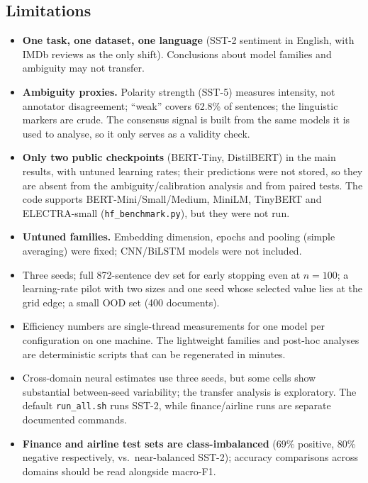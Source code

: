 \documentclass[11pt,a4paper]{article}
\begin{document}
\subsection*{Limitations}
\begin{itemize}
\item \textbf{One task, one dataset, one language} (SST-2 sentiment in English, with IMDb reviews as the only shift). Conclusions about model families and ambiguity may not transfer.
\item \textbf{Ambiguity proxies.} Polarity strength (SST-5) measures intensity, not annotator disagreement; ``weak'' covers 62.8\% of sentences; the linguistic markers are crude. The consensus signal is built from the same models it is used to analyse, so it only serves as a validity check.
\item \textbf{Only two public checkpoints} (BERT-Tiny, DistilBERT) in the main results, with untuned learning rates; their predictions were not stored, so they are absent from the ambiguity/calibration analysis and from paired tests. The code supports BERT-Mini/Small/Medium, MiniLM, TinyBERT and ELECTRA-small (\texttt{hf\_benchmark.py}), but they were not run.
\item \textbf{Untuned families.} Embedding dimension, epochs and pooling (simple averaging) were fixed; CNN/BiLSTM models were not included.
\item Three seeds; full 872-sentence dev set for early stopping even at $n=100$; a learning-rate pilot with two sizes and one seed whose selected value lies at the grid edge; a small OOD set (400 documents).
\item Efficiency numbers are single-thread measurements for one model per configuration on one machine. The lightweight families and post-hoc analyses are deterministic scripts that can be regenerated in minutes.
\item Cross-domain neural estimates use three seeds, but some cells show substantial between-seed variability; the transfer analysis is exploratory. The default \texttt{run\_all.sh} runs SST-2, while finance/airline runs are separate documented commands.
\item \textbf{Finance and airline test sets are class-imbalanced} (69\% positive, 80\% negative respectively, vs.\ near-balanced SST-2); accuracy comparisons across domains should be read alongside macro-F1.
\end{itemize}
\end{document}
